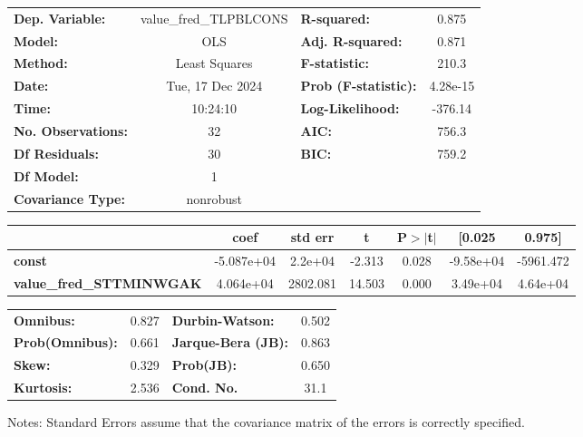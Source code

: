 \begin{center}
\begin{tabular}{lclc}
\toprule
\textbf{Dep. Variable:}          & value\_fred\_TLPBLCONS & \textbf{  R-squared:         } &     0.875   \\
\textbf{Model:}                  &          OLS           & \textbf{  Adj. R-squared:    } &     0.871   \\
\textbf{Method:}                 &     Least Squares      & \textbf{  F-statistic:       } &     210.3   \\
\textbf{Date:}                   &    Tue, 17 Dec 2024    & \textbf{  Prob (F-statistic):} &  4.28e-15   \\
\textbf{Time:}                   &        10:24:10        & \textbf{  Log-Likelihood:    } &   -376.14   \\
\textbf{No. Observations:}       &             32         & \textbf{  AIC:               } &     756.3   \\
\textbf{Df Residuals:}           &             30         & \textbf{  BIC:               } &     759.2   \\
\textbf{Df Model:}               &              1         & \textbf{                     } &             \\
\textbf{Covariance Type:}        &       nonrobust        & \textbf{                     } &             \\
\bottomrule
\end{tabular}
\begin{tabular}{lcccccc}
                                 & \textbf{coef} & \textbf{std err} & \textbf{t} & \textbf{P$> |$t$|$} & \textbf{[0.025} & \textbf{0.975]}  \\
\midrule
\textbf{const}                   &   -5.087e+04  &      2.2e+04     &    -2.313  &         0.028        &    -9.58e+04    &    -5961.472     \\
\textbf{value\_fred\_STTMINWGAK} &    4.064e+04  &     2802.081     &    14.503  &         0.000        &     3.49e+04    &     4.64e+04     \\
\bottomrule
\end{tabular}
\begin{tabular}{lclc}
\textbf{Omnibus:}       &  0.827 & \textbf{  Durbin-Watson:     } &    0.502  \\
\textbf{Prob(Omnibus):} &  0.661 & \textbf{  Jarque-Bera (JB):  } &    0.863  \\
\textbf{Skew:}          &  0.329 & \textbf{  Prob(JB):          } &    0.650  \\
\textbf{Kurtosis:}      &  2.536 & \textbf{  Cond. No.          } &     31.1  \\
\bottomrule
\end{tabular}
\end{center}

Notes: \newline
 [1] Standard Errors assume that the covariance matrix of the errors is correctly specified.